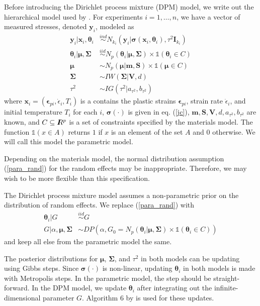 \documentclass[12pt]{article}
\newcommand{\m}[1]{\mathbf{\bm{#1}}}
\newcommand{\R}{I\hspace{-4.4pt}R}
\begin{document}
Before introducing the Dirichlet process mixture (DPM) model, we write out the hierarchical model used by \cite{fugate2005hierarchical}. For experiments $i=1,\ldots,n$, we have a vector of measured stresses, denoted $\m{y}_i$, modeled as
\begin{align}
\m{y}_i|\m{x}_i,\m{\theta}_i &\overset{ind}\sim N_{k_i}(\m{y}_i|\m{\sigma}(\m{x}_i,\m{\theta}_i),\tau^2\m{I}_{k_i}) \label{para} \\
\m{\theta}_i|\m{\mu}, \m{\Sigma} &\overset{iid}\sim N_p(\m{\theta}_i|\m{\mu},\m{\Sigma})\times\mathds{1}(\m{\theta}_i\in C) \label{para_rand} \\
\m{\mu} &\sim N_p(\m{\mu}|\m{m}, \m{S})\times\mathds{1}(\m{\mu}\in C) \nonumber \\
\m{\Sigma} &\sim IW(\m{\Sigma}|\m{V}, d) \nonumber \\
\tau^2 &\sim IG(\tau^2|a_{\tau^2}, b_{\tau^2}) \nonumber
\end{align}
where $\m{x}_i=(\m{\epsilon}_{pi},\dot\epsilon_i,T_i)$ is a contains the plastic strains $\m{\epsilon}_{pi}$, strain rate $\dot\epsilon_i$, and initial temperature $T_i$ for each $i$, $\m{\sigma}(\cdot)$ is given in eq. (\ref{jc}), $\m{m}, \m{S}, \m{V}, d, a_{\tau^2}, b_{\tau^2}$ are known, and $C\subseteq \R^p$ is a set of constraints specified by the materials model. The function $\mathds{1}(x \in A)$ returns $1$ if $x$ is an element of the set $A$ and $0$ otherwise. We will call this model the parametric model.

Depending on the materials model, the normal distribution assumption (\ref{para_rand}) for the random effects may be inappropriate. Therefore, we may wish to be more flexible than this specification.

The Dirichlet process mixture model assumes a non-parametric prior on the distribution of random effects. We replace (\ref{para_rand}) with
\begin{align}
\m{\theta}_i|G &\overset{iid}\sim G \nonumber \\
G|\alpha, \m{\mu}, \m{\Sigma} &\sim DP(\alpha, G_0=N_p(\m{\theta}_i|\m{\mu},\m{\Sigma})\times\mathds{1}(\m{\theta}_i\in C)) \nonumber
\end{align}
and keep all else from the parametric model the same.

The posterior distributions for $\m{\mu}$, $\m{\Sigma}$, and $\tau^2$ in both models can be updating using Gibbs steps. Since $\m{\sigma}(\cdot)$ is non-linear, updating $\m{\theta}_i$ in both models is made with Metropolis steps. In the parametric model, the step should be straight-forward. In the DPM model, we update $\m{\theta}_i$ after integrating out the infinite-dimensional parameter $G$. Algorithm 6 by \cite{neal2000markov} is used for these updates.
\end{document}
